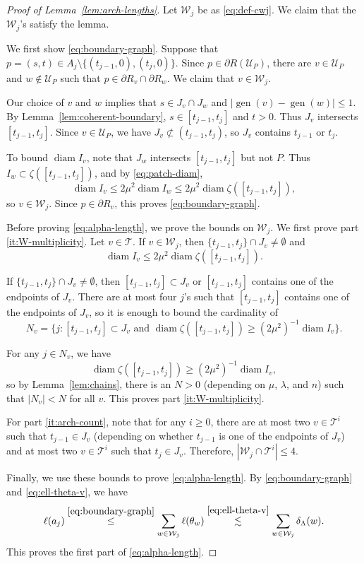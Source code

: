 \documentclass[12pt,reqno]{amsart}
\newcommand{\cT}{\mathcal{T}}
\newcommand{\cU}{\mathcal{U}}
\newcommand{\cW}{\mathcal{W}}
\DeclareMathOperator{\gen}{gen}
\theoremstyle{remark}
\newcommand{\0}{\mathbf{0}}
\renewcommand{\1}{\mathbf 1}
\DeclareMathOperator{\diam}{diam}
\begin{document}
\begin{proof}[Proof of Lemma~\ref{lem:arch-lengths}]
  Let $\cW_j$ be as \eqref{eq:def-cwj}.
  We claim that the $\cW_j$'s satisfy the lemma.
  
  We first show \eqref{eq:boundary-graph}. Suppose that $p = (s,t)\in A_j\setminus \{(t_{j-1},0), (t_{j},0)\}$. Since $p \in \partial R(\cU_P)$, there are $v\in \cU_P$ and $w\not \in \cU_P$ such that $p\in \partial R_v\cap \partial R_w$. We claim that $v\in \cW_j$. 

  Our choice of $v$ and $w$ implies that $s\in J_v\cap J_w$ and $|\gen(v) - \gen(w)| \le 1$. By Lemma~\ref{lem:coherent-boundary}, $s\in [t_{j-1},t_j]$ and $t>0$. Thus $J_v$ intersects $[t_{j-1},t_j]$. Since $v\in\cU_P$, we have $J_v\not\subset (t_{j-1},t_j)$, so $J_v$ contains $t_{j-1}$ or $t_j$.

  To bound $\diam I_v$, note that $J_w$ intersects $[t_{j-1},t_j]$ but not $P$. Thus $I_w\subset \zeta([t_{j-1},t_j])$, and by \eqref{eq:patch-diam}, 
  $$\diam I_v \le 2\mu^2 \diam I_w \le 2 \mu^2 \diam \zeta([t_{j-1},t_j]),$$
  so $v\in \cW_j$. Since $p\in\partial R_v$, this proves \eqref{eq:boundary-graph}.

  Before proving \eqref{eq:alpha-length}, we prove the bounds on $\cW_j$. We first prove part \ref{it:W-multiplicity}. Let $v\in \cT$. If $v\in \cW_j$, then $\{t_{j-1},t_j\}\cap J_v\ne \emptyset$ and $$\diam I_v \le 2 \mu^2 \diam \zeta([t_{j-1},t_j]).$$

  If $\{t_{j-1},t_j\}\cap J_v\ne \emptyset$, then $[t_{j-1},t_j] \subset J_v$ or $[t_{j-1},t_j]$ contains one of the endpoints of $J_v$. There are at most four $j$'s such that $[t_{j-1},t_j]$ contains one of the endpoints of $J_v$, so it is enough to bound the cardinality of
  $$N_v = \{j : [t_{j-1},t_j] \subset J_v\text{ and }\diam \zeta([t_{j-1},t_j]) \ge (2\mu^2)^{-1}\diam I_v\}.$$

  For any $j\in N_v$, we have $$\diam \zeta([t_{j-1},t_j]) \ge (2 \mu^2)^{-1}\diam I_v,$$ so by
  Lemma~\ref{lem:chains}, there is an $N>0$ (depending on $\mu$, $\lambda$, and $n$) such that $|N_v| < N$ for all $v$. This proves part \ref{it:W-multiplicity}.

  For part \ref{it:arch-count}, note that for any $i\ge 0$, there are at most two $v\in \cT^i$ such that $t_{j-1}\in J_v$ (depending on whether $t_{j-1}$ is one of the endpoints of $J_v$) and at most two $v\in \cT^i$ such that $t_{j}\in J_v$. Therefore, $|\cW_j \cap \cT^i|\le 4$.

  Finally, we use these bounds to prove \eqref{eq:alpha-length}. By \eqref{eq:boundary-graph} and \eqref{eq:ell-theta-v}, we have
  $$\ell(a_j) \stackrel{\eqref{eq:boundary-graph}}{\le} \sum_{w\in \cW_j} \ell(\theta_w) \stackrel{\eqref{eq:ell-theta-v}}{\lesssim} \sum_{w\in \cW_j} \delta_\Lambda(w).$$
  This proves the first part of \eqref{eq:alpha-length}.


\end{proof}
\end{document}
